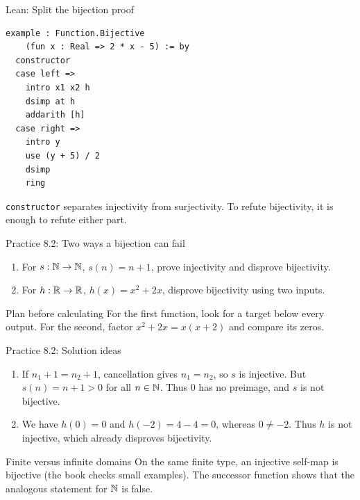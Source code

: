 \begin{frame}[fragile]{Lean: Split the bijection proof}
\begin{lstlisting}
example : Function.Bijective
    (fun x : Real => 2 * x - 5) := by
  constructor
  case left =>
    intro x1 x2 h
    dsimp at h
    addarith [h]
  case right =>
    intro y
    use (y + 5) / 2
    dsimp
    ring
\end{lstlisting}
\texttt{constructor} separates injectivity from surjectivity.
To refute bijectivity, it is enough to refute either part.
\end{frame}

\begin{frame}{Practice 8.2: Two ways a bijection can fail}
\begin{enumerate}
\item For $s:\mathbb{N}\to\mathbb{N}$, $s(n)=n+1$, prove injectivity and disprove bijectivity.
\item For $h:\mathbb{R}\to\mathbb{R}$, $h(x)=x^2+2x$, disprove bijectivity using two inputs.
\end{enumerate}
\begin{block}{Plan before calculating}
For the first function, look for a target below every output.
For the second, factor $x^2+2x=x(x+2)$ and compare its zeros.
\end{block}
\end{frame}

\begin{frame}{Practice 8.2: Solution ideas}
\begin{enumerate}
\item If $n_1+1=n_2+1$, cancellation gives $n_1=n_2$, so $s$ is injective.
But $s(n)=n+1>0$ for all $n\in\mathbb{N}$. Thus $0$ has no preimage, and $s$ is not bijective.
\item We have $h(0)=0$ and $h(-2)=4-4=0$, whereas $0\ne-2$.
Thus $h$ is not injective, which already disproves bijectivity.
\end{enumerate}
\begin{block}{Finite versus infinite domains}
On the same finite type, an injective self-map is bijective (the book checks small examples).
The successor function shows that the analogous statement for $\mathbb{N}$ is false.
\end{block}
\end{frame}

